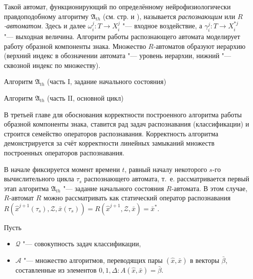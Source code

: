 Такой автомат, функционирующий по определённому нейрофизиологически правдоподобному алгоритму $\mathfrak A_{th}$ (см. стр. \pageref{alg:th_init} и \pageref{alg:th_cycle}), называется \textit{распознающим} или\textit{ $R$-автоматом}. Здесь и далее $\omega_i^j:T{\to}X_i^j$ "--- входное воздействие, а $\gamma_i^j:T{\to}X_i^{*j}$ "--- выходная величина. Алгоритм работы распознающего автомата моделирует работу образной компоненты знака. Множество $R$-автоматов образуют иерархию (верхний индекс в обозначении автомата "--- уровень иерархии, нижний "--- сквозной индекс по множеству).

\begin{algorithm}[h]
	\caption{Алгоритм $\mathfrak{A}_{th}$ (часть I, задание начального состояния)}\label{alg:th_init}
	\begin{algorithmic}[1]
		
	\end{algorithmic}
\end{algorithm}

\begin{algorithm}[h]
	\caption{Алгоритм $\mathfrak{A}_{th}$ (часть II, основной цикл)}\label{alg:th_cycle}
	\begin{algorithmic}[1]
		\algrestore{algst:store1}
		
	\end{algorithmic}
\end{algorithm}

В третьей главе для обоснования корректности построенного алгоритма работы образной компоненты знака, ставится рад задач распознавания (классификации) и строится семейство операторов распознавания. Корректность алгоритма демонстрируется за счёт корректности линейных замыканий множеств построенных операторов распознавания.

В начале фиксируется момент времени $t$, равный началу некоторого $s$-го вычислительного цикла $\tau_s$ распознающего автомата, т.~е. рассматривается первый этап алгоритма $\mathfrak A_{th}$ "--- задание начального состояния $R$-автомата. В этом случае, $R$-автомат $R$ можно рассматривать как статический оператор распознавания $R(\hat x^{j+1}(\tau_s),\mathcal Z,\bar x(\tau_s))=R(\hat x^{j+1},\mathcal Z,\bar x)=\bar x^*$.

Пусть
\begin{itemize}
	\item $\mathcal Q$ "--- совокупность задач классификации,
	\item $\mathcal A$ "--- множество алгоритмов, переводящих пары $(\hat{x},\bar{x})$ в векторы $\bar{\beta}$, составленные из элементов $0,1,\Delta:A(\hat{x},\bar{x})=\bar{\beta}$.
\end{itemize}

